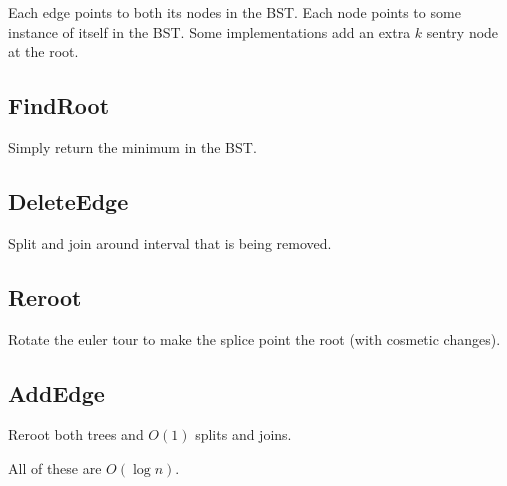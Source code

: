 \documentclass[a4paper]{article}
\begin{document}
Each edge points to both its nodes in the BST.
Each node points to some instance of itself in the BST.
Some implementations add an extra $k$ sentry node at the root.

\subsection{FindRoot}
Simply return the minimum in the BST.

\subsection{DeleteEdge}
Split and join around interval that is being removed.

\subsection{Reroot}
Rotate the euler tour to make the splice point the root (with cosmetic changes).

\subsection{AddEdge}
Reroot both trees and $O(1)$ splits and joins.

All of these are $O(\log n)$.
\end{document}
